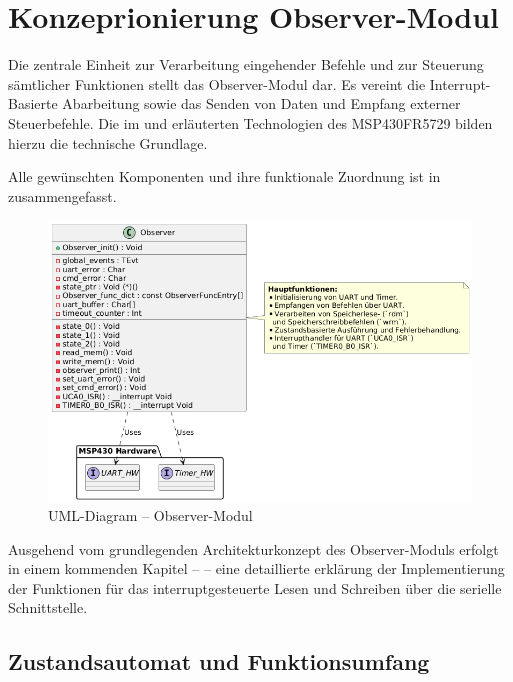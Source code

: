 \newpage
\section{Konzeprionierung Observer-Modul}
\label{sec:ObserverModulKonzept}

Die zentrale Einheit zur Verarbeitung eingehender Befehle und zur Steuerung s\"amtlicher Funktionen stellt das Observer-Modul dar. Es vereint die Interrupt-Basierte Abarbeitung sowie das Senden von Daten und Empfang externer Steuerbefehle. Die im  und  erl\"auterten Technologien des MSP430FR5729 bilden hierzu die technische Grundlage.

Alle gew\"unschten Komponenten und ihre funktionale Zuordnung ist in  zusammengefasst.

\begin{figure}[h!]
	\centering
	\includegraphics[width=1.0\textwidth]{../Bilder/observer_class_diagram.png}
	\caption{UML-Diagram -- Observer-Modul}
	\label{fig:UmlDiagram_ObserverModul}
\end{figure}

Ausgehend vom grundlegenden Architekturkonzept des Observer-Moduls erfolgt in einem kommenden Kapitel --  -- eine detaillierte erkl\"arung der Implementierung der Funktionen f\"ur das interruptgesteuerte Lesen und Schreiben \"uber die serielle Schnittstelle.


\newpage
\subsection{Zustandsautomat und Funktionsumfang}
\label{sec:ZustaendeUndFunktionen}

